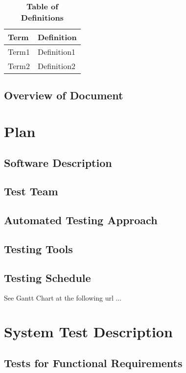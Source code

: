 \documentclass[12pt, titlepage]{article}
\begin{document}
\begin{table}[!htbp]
\caption{\textbf{Table of Definitions}} \label{Table}

\begin{tabularx}{\textwidth}{p{3cm}X}
\toprule
\textbf{Term} & \textbf{Definition}\\
\midrule
Term1 & Definition1\\
Term2 & Definition2\\
\bottomrule
\end{tabularx}

\end{table}	

\subsection{Overview of Document}

\section{Plan}
	
\subsection{Software Description}

\subsection{Test Team}

\subsection{Automated Testing Approach}

\subsection{Testing Tools}

\subsection{Testing Schedule}
		
See Gantt Chart at the following url ...

\section{System Test Description}
	
\subsection{Tests for Functional Requirements}
\end{document}
